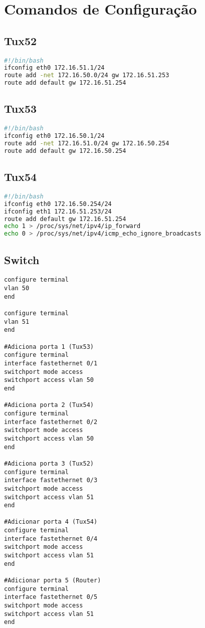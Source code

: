 \section{Comandos de Configuração}




\subsection{Tux52}
\begin{lstlisting}[caption=tux52\_configuration, language=bash]
#!/bin/bash
ifconfig eth0 172.16.51.1/24
route add -net 172.16.50.0/24 gw 172.16.51.253
route add default gw 172.16.51.254
\end{lstlisting}



\subsection{Tux53}
\begin{lstlisting}[caption=tux53\_configuration, language=bash]
#!/bin/bash
ifconfig eth0 172.16.50.1/24
route add -net 172.16.51.0/24 gw 172.16.50.254
route add default gw 172.16.50.254
\end{lstlisting}




\subsection{Tux54}
\begin{lstlisting}[caption=tux54\_configuration, language=bash]
#!/bin/bash
ifconfig eth0 172.16.50.254/24
ifconfig eth1 172.16.51.253/24
route add default gw 172.16.51.254
echo 1 > /proc/sys/net/ipv4/ip_forward
echo 0 > /proc/sys/net/ipv4/icmp_echo_ignore_broadcasts
\end{lstlisting}

\subsection{Switch}

\begin{lstlisting}[caption=switch\_configuration]
configure terminal
vlan 50
end

configure terminal
vlan 51
end

#Adiciona porta 1 (Tux53)
configure terminal
interface fastethernet 0/1
switchport mode access
switchport access vlan 50
end

#Adiciona porta 2 (Tux54)
configure terminal
interface fastethernet 0/2
switchport mode access
switchport access vlan 50
end

#Adiciona porta 3 (Tux52)
configure terminal
interface fastethernet 0/3
switchport mode access
switchport access vlan 51
end

#Adicionar porta 4 (Tux54)
configure terminal
interface fastethernet 0/4
switchport mode access
switchport access vlan 51
end

#Adicionar porta 5 (Router)
configure terminal
interface fastethernet 0/5
switchport mode access
switchport access vlan 51
end
\end{lstlisting}




